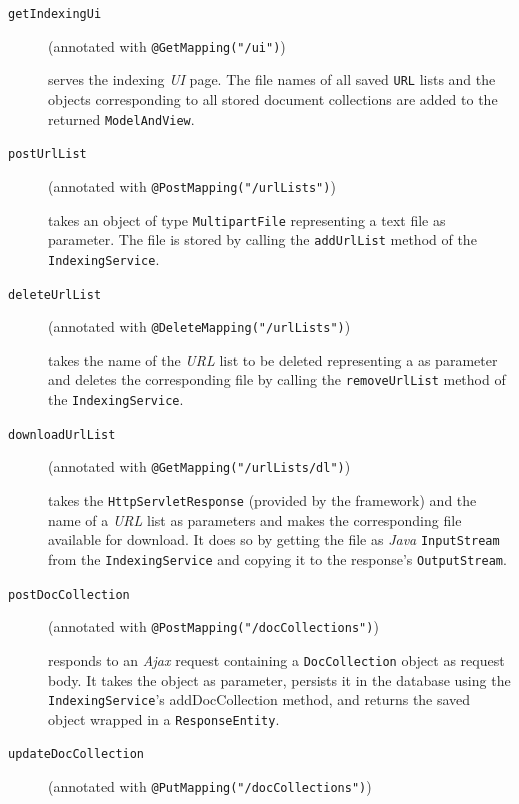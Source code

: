 \documentclass[a4paper]{usiinfbachelorproject}
\begin{document}
    \begin{description}

        \item[\texttt{getIndexingUi}]
        (annotated with \texttt{@GetMapping("/ui")})

        serves the indexing \emph{UI} page. The file names of all saved \texttt{URL} lists and the 
        objects corresponding to all stored document collections are added to the returned \texttt{ModelAndView}.

        \item[\texttt{postUrlList}]
        (annotated with \texttt{@PostMapping("/urlLists")})

        takes an object of type \texttt{MultipartFile} representing a text file as parameter. The file is stored
        by calling the \texttt{addUrlList} method of the \texttt{IndexingService}.

        \item[\texttt{deleteUrlList}]
        (annotated with \texttt{@DeleteMapping("/urlLists")})

        takes the name of the \emph{URL} list to be deleted representing a as parameter and deletes the corresponding file
        by calling the \texttt{removeUrlList} method of the \texttt{IndexingService}.

        \item[\texttt{downloadUrlList}]
        (annotated with \texttt{@GetMapping("/urlLists/dl")})

        takes the \texttt{HttpServletResponse} (provided by the framework) and the name of a \emph{URL} list as parameters 
        and makes the corresponding file available for download.
        It does so by getting the file as \emph{Java} \texttt{InputStream} from the \texttt{IndexingService} and
        copying it to the response's \texttt{OutputStream}. 
        
        \item[\texttt{postDocCollection}]
        (annotated with \texttt{@PostMapping("/docCollections")})

        responds to an \emph{Ajax} request containing a \texttt{DocCollection} object as request body.
        It takes the object as parameter, persists it in the database using the \texttt{IndexingService}'s addDocCollection method,
        and returns the saved object wrapped in a \texttt{ResponseEntity}.

        \item[\texttt{updateDocCollection}]
        (annotated with \texttt{@PutMapping("/docCollections")})


\end{description}
\end{document}
